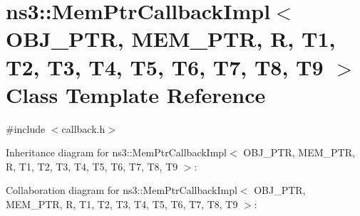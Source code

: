 \hypertarget{classns3_1_1MemPtrCallbackImpl}{}\section{ns3\+:\+:Mem\+Ptr\+Callback\+Impl$<$ O\+B\+J\+\_\+\+P\+TR, M\+E\+M\+\_\+\+P\+TR, R, T1, T2, T3, T4, T5, T6, T7, T8, T9 $>$ Class Template Reference}
\label{classns3_1_1MemPtrCallbackImpl}


{\ttfamily \#include $<$callback.\+h$>$}



Inheritance diagram for ns3\+:\+:Mem\+Ptr\+Callback\+Impl$<$ O\+B\+J\+\_\+\+P\+TR, M\+E\+M\+\_\+\+P\+TR, R, T1, T2, T3, T4, T5, T6, T7, T8, T9 $>$\+:


Collaboration diagram for ns3\+:\+:Mem\+Ptr\+Callback\+Impl$<$ O\+B\+J\+\_\+\+P\+TR, M\+E\+M\+\_\+\+P\+TR, R, T1, T2, T3, T4, T5, T6, T7, T8, T9 $>$\+:
